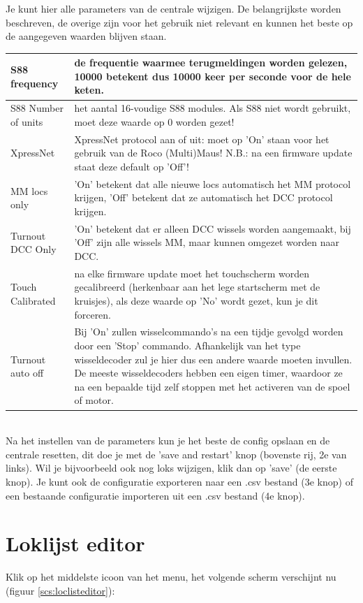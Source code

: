 \documentclass[12pt,a4paper]{report}
\begin{document}
Je kunt hier alle parameters van de centrale wijzigen. De belangrijkste worden beschreven, de overige zijn voor het gebruik niet relevant en kunnen het beste op de aangegeven waarden blijven staan.

\begin{tabular}{|l|p{10cm}|}
\hline
S88 frequency&de frequentie waarmee terugmeldingen worden gelezen, 10000 betekent dus 10000 keer per seconde voor de hele keten.\\
\hline
S88 Number of units&het aantal 16-voudige S88 modules. Als S88 niet wordt gebruikt, moet deze waarde op 0 worden gezet!\\
\hline
XpressNet&XpressNet protocol aan of uit: moet op 'On' staan voor het gebruik van de Roco (Multi)Maus! N.B.: na een firmware update staat deze default op 'Off'!\\
\hline
MM locs only&'On' betekent dat alle nieuwe locs automatisch het MM protocol krijgen, 'Off' betekent dat ze automatisch het DCC protocol krijgen.\\
\hline
Turnout DCC Only&'On' betekent dat er alleen DCC wissels worden aangemaakt, bij 'Off' zijn alle wissels MM, maar kunnen omgezet worden naar DCC.\\
\hline
Touch Calibrated&na elke firmware update moet het touchscherm worden gecalibreerd (herkenbaar aan het lege startscherm met de kruisjes), als deze waarde op 'No' wordt gezet, kun je dit forceren.\\
\hline
Turnout auto off&Bij 'On' zullen wisselcommando's na een tijdje gevolgd worden door een 'Stop' commando. Afhankelijk van het type wisseldecoder zul je hier dus een andere waarde moeten invullen. De meeste wisseldecoders hebben een eigen timer, waardoor ze na een bepaalde tijd zelf stoppen met het activeren van de spoel of motor.\\
\hline
\end{tabular}\\

Na het instellen van de parameters kun je het beste de config opslaan en de centrale resetten, dit doe je met de 'save and restart' knop (bovenste rij, 2e van links). Wil je bijvoorbeeld ook nog loks wijzigen, klik dan op 'save' (de eerste knop).
Je kunt ook de configuratie exporteren naar een .csv bestand (3e knop) of een bestaande configuratie importeren uit een .csv bestand (4e knop).

\section{Loklijst editor}
Klik op het middelste icoon van het menu, het volgende scherm verschijnt nu (figuur \ref{scs:loclisteditor}):\\
\end{document}
